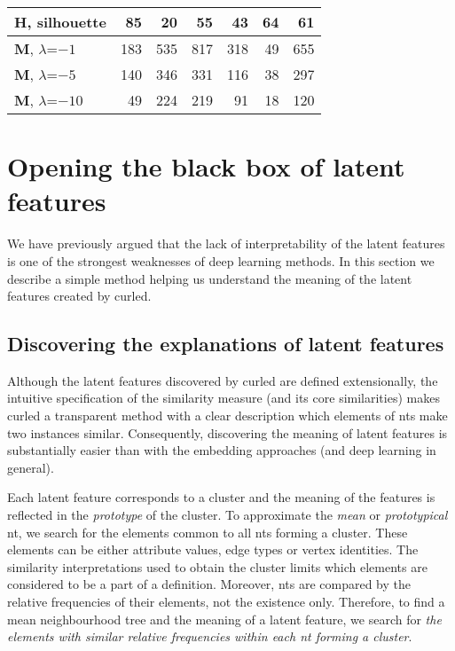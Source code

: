 \begin{table}[t]
{\begin{tabular}[t]{@{}lrrrrrr@{}}
    \textbf{H}, silhouette  		& 85           & 20  	 & 55  		& 43   		& 64  & 61 \\
	\midrule
	\textbf{M}, $\lambda$=$-1$ 		& 183          & 535     & 817		& 318  		& 49   &  655	   \\

	\textbf{M}, $\lambda$=$-5$ 		& 140          & 346   	 & 331		& 116    	& 38   & 297	   \\

	\textbf{M}, $\lambda$=$-10$		& 49          & 224 	 & 219		& 91  		& 18   & 120	   \\
	\bottomrule

\end{tabular}
}

\label{tab:Size}

\end{table}



\section{Opening the black box of latent features}

We have previously argued that the lack of interpretability of the latent features is one of the strongest weaknesses of deep learning methods.
In this section we describe a simple method helping us understand the meaning of the latent features created by \gls{curled}.






\subsection{Discovering the explanations of latent features}

Although the latent features discovered by \gls{curled} are defined extensionally, the intuitive specification of the similarity measure (and its core similarities) makes \gls{curled} a transparent method with a clear description which elements of \gls{nt}s make two instances similar.
Consequently, discovering the meaning of latent features is substantially easier than with the embedding approaches (and deep learning in general).

Each latent feature corresponds to a cluster and the meaning of the features is reflected in the \textit{prototype} of the cluster.
To approximate the \textit{mean} or \textit{prototypical} \gls{nt}, we search for the elements common to all \gls{nt}s forming a cluster.
These elements can be either attribute values, edge types or vertex identities.
The similarity interpretations used to obtain the cluster limits which elements are considered to be a part of a definition.
Moreover, \gls{nt}s are compared by the relative frequencies of their elements, not the existence only.
Therefore, to find a mean neighbourhood tree and the meaning of a latent feature, we search for \textit{the elements with similar relative frequencies within each \gls{nt} forming a cluster}.



